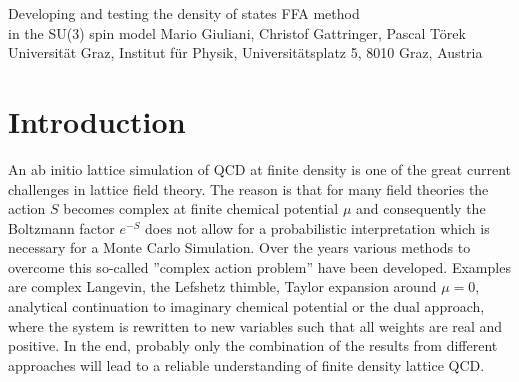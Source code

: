 \documentclass[a4paper,11pt]{article}
\begin{document}
\sffamily
 
\begin{center}
{\LARGE
Developing and testing the density of states FFA method\\ 
\vskip2mm
in the SU(3) spin model}
\vskip15mm
Mario Giuliani, Christof Gattringer, Pascal T\"orek
\vskip8mm
Universit\"at Graz, Institut f\"ur Physik, Universit\"atsplatz 5, 8010 Graz, Austria
\end{center}
\vskip8mm

\begin{abstract}
The Density of States Functional Fit Approach (DoS FFA) is a recently proposed modern 
density of states technique suitable for calculations in lattice field theories with a complex action problem. 
In this article we present an exploratory implementation of DoS FFA for the SU(3) spin system at 
finite chemical potential $\mu$ -- 
an effective theory for the Polyakov loop. This model has a complex action problem similar to the one 
of QCD but also allows for a dual simulation in terms of worldlines where the complex action problem is solved.
Thus we can compare the DoS FFA results to the reference data from the dual simulation and assess the 
performance of the new approach. We find that the method reproduces the observables from the dual simulation
for a large range of $\mu$ values, including also phase transitions,
illustrating that DoS FFA is an interesting approach for exploring phase diagrams
of lattice field theories with a complex action problem. 
\end{abstract}

\vskip8mm

\section{Introduction}

An ab initio lattice simulation of QCD at finite density is one of the great current challenges in lattice field theory. 
The reason is that for many field theories the action $S$ becomes complex at finite chemical potential
$\mu$ and consequently the Boltzmann factor $e^{-S}$ does not allow for a probabilistic interpretation which
is necessary for a Monte Carlo Simulation. Over the years various methods to overcome this so-called ''complex 
action problem'' have been developed. Examples are complex Langevin, the Lefshetz thimble,
Taylor expansion around $\mu=0$, 
analytical continuation to imaginary chemical potential or the dual approach, where the system is rewritten 
to new variables such that all weights are real and positive. In the end, probably only the combination of the results from 
different approaches will lead to a reliable understanding of finite density lattice QCD.
\end{document}
